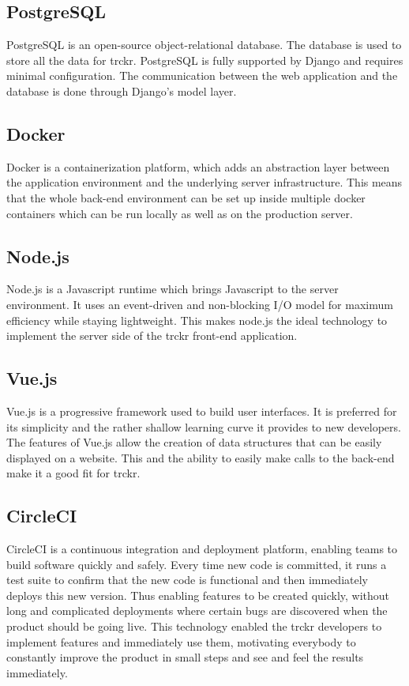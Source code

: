 \documentclass[bibliography=totoc, listof=totocnumbered]{scrartcl}
\begin{document}
\subsection{PostgreSQL}
PostgreSQL is an open-source object-relational database.\cite{postgre} The
database is used to store all the data for trckr. PostgreSQL is fully supported
by Django and requires minimal configuration. The communication between the web
application and the database is done through Django's model layer.

\subsection{Docker}
Docker is a containerization platform, which adds an abstraction layer between
the application environment and the underlying server
infrastructure.\cite{docker} This means that the whole back-end environment can
be set up inside multiple docker containers which can be run locally as well as
on the production server.

\subsection{Node.js}
Node.js is a Javascript runtime which brings Javascript to the server
environment.\cite{nodejs} It uses an event-driven and non-blocking I/O model for
maximum efficiency while staying lightweight. This makes node.js the ideal
technology to implement the server side of the trckr front-end application.

\subsection{Vue.js}
Vue.js is a progressive framework used to build user interfaces.\cite{vuejs} It
is preferred for its simplicity and the rather shallow learning curve it
provides to new developers. The features of Vue.js allow the creation of data
structures that can be easily displayed on a website. This and the ability to
easily make calls to the back-end make it a good fit for trckr.

\subsection{CircleCI}
CircleCI is a continuous integration and deployment platform, enabling teams to
build software quickly and safely. Every time new code is committed, it runs a
test suite to confirm that the new code is functional and then immediately
deploys this new version. Thus enabling features to be created quickly, without
long and complicated deployments where certain bugs are discovered when the
product should be going live. This technology enabled the trckr developers to
implement features and immediately use them, motivating everybody to constantly
improve the product in small steps and see and feel the results immediately.
\end{document}
